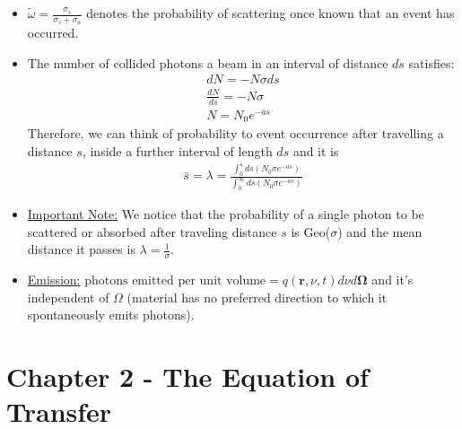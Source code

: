 \documentclass[15pt]{article}
\begin{document}
\begin{itemize}
\item $\tilde{\omega}=\frac{\sigma_s}{\sigma_s+\sigma_a}$ denotes the probability of scattering once known that an event has occurred.
\item  The number of collided photons a beam in an interval of distance $ds$ satisfies:
\begin{align}
    dN=-N\sigma ds \\
    \frac{dN}{ds}=-N\sigma \\
    N=N_0e^{-as}
\end{align}
Therefore, we can think of probability to event occurrence after travelling a distance $s$, inside a further interval of length $ds$ and it is 
\begin{align}
    \bar s=\lambda=\frac{\int_0^s ds\left(N_0\sigma e^{-as}\right)}{\int_0^\infty ds\left(N_0\sigma e^{-as}\right)}
\end{align}
\item \underline{Important Note:} We notice that the probability of a single photon to be scattered or absorbed after traveling distance $s$ is Geo($\sigma$) and the mean distance it passes is $\lambda=\frac{1}{\sigma}$.
\item \underline{Emission:} $\text{photons emitted per unit volume} = q(\bm r,\nu,t)d\nu d\bm\Omega$ and it's independent of $\Omega$ (material has no preferred direction to which it spontaneously emits photons).

\end{itemize}
\section{Chapter 2 - The Equation of Transfer}
\end{document}
